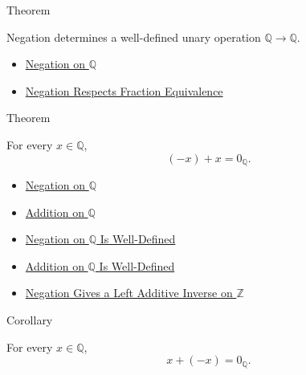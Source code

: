 \begin{theorembox}{Theorem}
\begin{theorem}
\label{thm:negation-on-q-well-defined}
Negation determines a well-defined unary operation $\mathbb{Q}\to\mathbb{Q}$.
\end{theorem}
\end{theorembox}

\begin{dependencies}
\begin{itemize}
  \item \hyperref[def:negation-on-q-classes]{Negation on $\mathbb{Q}$}
  \item \hyperref[lem:negation-on-q-respects-equivalence]{Negation Respects Fraction Equivalence}
\end{itemize}
\end{dependencies}

\begin{theorembox}{Theorem}
\begin{theorem}
\label{thm:negation-left-additive-inverse-on-q}
For every $x\in\mathbb{Q}$,
\[
(-x)+x=0_{\mathbb{Q}}.
\]
\end{theorem}
\end{theorembox}

\begin{dependencies}
\begin{itemize}
  \item \hyperref[def:negation-on-q-classes]{Negation on $\mathbb{Q}$}
  \item \hyperref[def:addition-on-q-classes]{Addition on $\mathbb{Q}$}
  \item \hyperref[thm:negation-on-q-well-defined]{Negation on $\mathbb{Q}$ Is Well-Defined}
  \item \hyperref[thm:addition-on-q-well-defined]{Addition on $\mathbb{Q}$ Is Well-Defined}
  \item \hyperref[thm:negation-left-additive-inverse-on-z]{Negation Gives a Left Additive Inverse on $\mathbb{Z}$}
\end{itemize}
\end{dependencies}

\begin{corollarybox}{Corollary}
\begin{corollary}
\label{cor:negation-right-additive-inverse-on-q}
For every $x\in\mathbb{Q}$,
\[
x+(-x)=0_{\mathbb{Q}}.
\]
\end{corollary}
\end{corollarybox}

